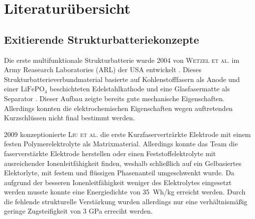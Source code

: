 

\section{\label{sec:Literaturübersicht}Literaturübersicht}

\subsection{Exitierende Strukturbatteriekonzepte}

Die erste multifunktionale Strukturbatterie wurde 2004 von \textsc{Wetzel et al.} im Army Reasearch Laboratories (ARL) der USA entwickelt \cite{Wetzel2004, Snyder2006, Wong2007, Snyder2007}. Dieses Strukturbatterieverbundmaterial basierte auf Kohlenstofffasern als Anode und einer $\text{LiFePO}_\text{4}$ beschichteten Edelstahlkathode und eine Glasfasermatte als Separator \cite{Wong2007}. Dieser Aufbau zeigte bereits gute mechanische Eigenschaften. Allerdings konnten die elektrochemischen Eigenschaften wegen auftretenden Kurzschlüssen nicht final bestimmt werden.

2009 konzeptionierte \textsc{Liu et al.} \cite{Liu2009} die erste Kurzfaserverträrkte Elektrode mit einem festen Polymerelektrolyte als Matrixmaterial. Allerdings konnte das Team die faserverstärkte Elektrode herstellen oder einen Feststoffelektrolyte mit ausreichender Ionenleitfähigkeit finden, weshalb schließlich auf ein Gelbasiertes Elektorlyte, mit festem und flüssigen Phasenanteil umgeschwenkt wurde. Da aufgrund der besseren Ionenleitfähigkeit weniger des Elektrolytes eingesetzt werden musste konnte eine Energiedichte von 35~Wh/kg erreicht werden.  Durch die fehlende strukturelle Verstärkung wurden allerdings nur eine verhältnismäßig geringe Zugsteifigkeit von 3 GPa erreciht werden.

